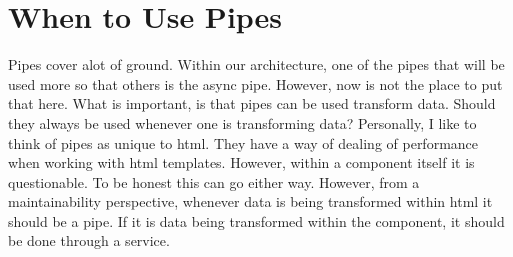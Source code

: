 \section{ When to Use Pipes }
Pipes cover alot of ground. Within our architecture, one of the pipes that will
be used more so that others is the async pipe. However, now is not the place
to put that here. What is important, is that pipes can be used transform data.
Should they always be used whenever one is transforming data? Personally,
I like to think of pipes as unique to html. They have a way of dealing of
performance when working with html templates. However, within a component
itself it is questionable. To be honest this can go either way. However, from a
maintainability perspective, whenever data is being transformed within html it
should be a pipe. If it is data being transformed within the component, it
should be done through a service.

